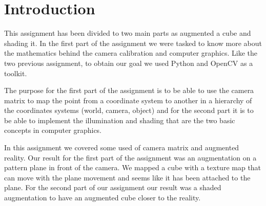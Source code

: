 \pagebreak{}
\section{Introduction}

This assignment has been divided to two main parts as augmented a cube and shading it. In the first part of the assignment we were tasked to know more about the mathematics behind the camera calibration and computer graphics. Like the two previous assignment, to obtain our goal we used Python and OpenCV as a toolkit.

The purpose for the first part of the assignment is to be able to use the camera matrix to map the point from a coordinate system to another in a hierarchy of the coordinates systems (world, camera, object) and for the second part it is to be able to implement the illumination and shading that are the two basic concepts in computer graphics. 

In this assignment we covered some used of camera matrix and augmented reality. Our result for the first part of the assignment was an augmentation on a pattern plane in front of the camera. We mapped a cube with a texture map that can move with the plane movement and seems like it has been attached to the plane. For the second part of our assignment our result was a shaded augmentation to have an augmented cube closer to the reality.
